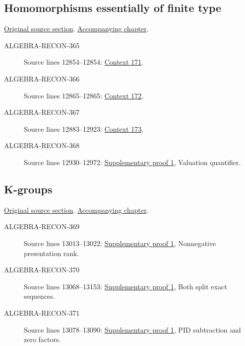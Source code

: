 \subsection{Homomorphisms essentially of finite type}
\hypertarget{algebra-source-section-essentially-of-finite-type}{}
\noindent\href{https://github.com/stacks/stacks-project/blob/a04446e57ec1fbc252a871afcec7752fb2807b14/algebra.tex\#L12829}{Original source section}. \href{algebra.pdf\#nameddest=section-essentially-of-finite-type}{Accompanying chapter}.

\begin{description}
\item[ALGEBRA-RECON-365] Source lines 12854--12854: \hyperlink{algebra-context-171}{Context 171}.
\item[ALGEBRA-RECON-366] Source lines 12865--12865: \hyperlink{algebra-context-172}{Context 172}.
\item[ALGEBRA-RECON-367] Source lines 12883--12923: \hyperlink{algebra-context-173}{Context 173}.
\item[ALGEBRA-RECON-368] Source lines 12930--12972: \hyperlink{algebra_localization_kgroups_graded_notes_20260927}{Supplementary proof 1}, Valuation quantifier.
\end{description}

\subsection{K-groups}
\hypertarget{algebra-source-section-K-groups}{}
\noindent\href{https://github.com/stacks/stacks-project/blob/a04446e57ec1fbc252a871afcec7752fb2807b14/algebra.tex\#L12995}{Original source section}. \href{algebra.pdf\#nameddest=section-K-groups}{Accompanying chapter}.

\begin{description}
\item[ALGEBRA-RECON-369] Source lines 13013--13022: \hyperlink{algebra_localization_kgroups_graded_notes_20260927}{Supplementary proof 1}, Nonnegative presentation rank.
\item[ALGEBRA-RECON-370] Source lines 13068--13153: \hyperlink{algebra_localization_kgroups_graded_notes_20260927}{Supplementary proof 1}, Both split exact sequences.
\item[ALGEBRA-RECON-371] Source lines 13078--13090: \hyperlink{algebra_localization_kgroups_graded_notes_20260927}{Supplementary proof 1}, PID subtraction and zero factors.
\end{description}

